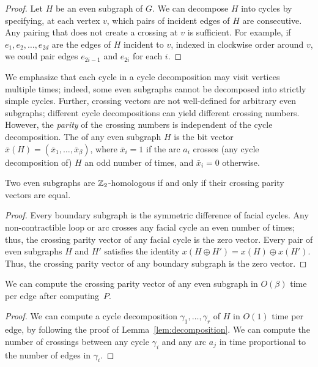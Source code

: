 \begin{proof}
Let $H$ be an even subgraph of $G$.  We can decompose $H$ into cycles by specifying, at each vertex $v$, which pairs of incident edges of $H$ are consecutive.  Any pairing that does not create a crossing at $v$ is sufficient.  For example, if $e_1, e_2, \dots, e_{2d}$ are the edges of $H$ incident to $v$, indexed in clockwise order around $v$, we could pair edges $e_{2i-1}$ and $e_{2i}$ for each $i$.  
\end{proof}

We emphasize that each cycle in a cycle decomposition may visit vertices multiple times; indeed, some even subgraphs cannot be decomposed into strictly simple cycles.
Further, crossing vectors are not well-defined for arbitrary even subgraphs; different cycle decompositions can yield different crossing numbers.  However, the \emph{parity} of the crossing numbers is independent of the cycle decomposition.  The  of any even subgraph $H$ is the bit vector $\bar{x}(H) = (\bar{x}_1, \dots, \bar{x}_\beta)$, where $\bar{x}_i = 1$ if the arc $a_i$ crosses (any cycle decomposition of) $H$ an odd number of times, and $\bar{x}_i = 0$ otherwise.

\begin{lemma}
Two even subgraphs are $\mathbb{Z}_2$-homologous if and only if their crossing parity vectors are equal.
\end{lemma}

\begin{proof}
Every boundary subgraph is the symmetric difference of facial cycles.  Any non-contractible loop or arc crosses any facial cycle an even number of times; thus, the crossing parity vector of any facial cycle is the zero vector.  Every pair of even subgraphs $H$ and $H'$ satisfies the identity $x(H\oplus H') = x(H) \oplus x(H')$.  Thus, the crossing parity vector of any boundary subgraph is the zero vector.
\end{proof}

\begin{lemma}
We can compute the crossing parity vector of any even subgraph in $O(\beta)$ time per edge after computing~$P$.
\end{lemma}

\begin{proof}
We can compute a cycle decomposition $\gamma_1, \dots, \gamma_r$ of $H$ in $O(1)$ time per edge, by following the proof of Lemma~\ref{lem:decomposition}.
We can compute the number of crossings between any cycle $\gamma_i$ and any arc $a_j$ in time proportional to the number of edges in $\gamma_i$.
\end{proof}



